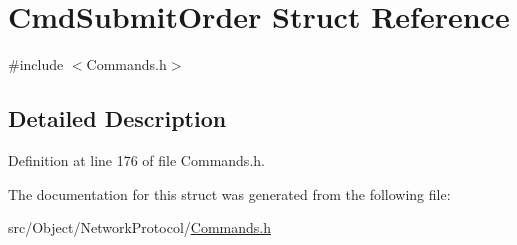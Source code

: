 \hypertarget{struct_cmd_submit_order}{
\section{CmdSubmitOrder Struct Reference}
\label{struct_cmd_submit_order}
}


{\ttfamily \#include $<$Commands.h$>$}



\subsection{Detailed Description}


Definition at line 176 of file Commands.h.



The documentation for this struct was generated from the following file:\begin{DoxyCompactItemize}
\item 
src/Object/NetworkProtocol/\hyperlink{_commands_8h}{Commands.h}\end{DoxyCompactItemize}
